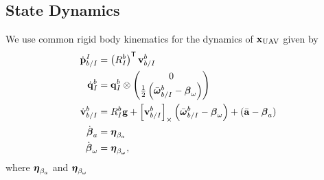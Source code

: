 
\subsection{State Dynamics}
We use common rigid body kinematics for the dynamics of
$\boldsymbol{\mathrm{x}}_{\text{UAV}}$ given by
\begin{align}
  \dot{\vect{p}}_{b/I}^I
  &=
  \left( R_I^b \right)^\transpose \vect{v}_{b/I}^b
  \label{eq:uav_dynamics}
  \\
  \dot{\vect{q}}_{I}^{b} 
	&= 	
  \q_I^b \otimes \begin{pmatrix} 0 \\ \frac{1}{2}
  \left( \bar{\vect{\omega}}_{b/I}^b - \vect{\beta}_\omega \right)
\end{pmatrix} \nonumber \\
  \dot{\vect{v}}_{b/I}^b 
  &=
  R_I^b \vect{g}
  +
  \skewmat{\vect{v}_{b/I}^b}
  \left( \bar{\vect{\omega}}_{b/I}^b - \vect{\beta}_\omega \right)
  +
  \left( \bar{\vect{a}} - \vect{\beta}_a \right) \nonumber
  \\
  \dot{\vect{\beta}}_a &= \vect{\eta}_{\beta_a} \nonumber
  \\
  \dot{\vect{\beta}}_\omega &= \vect{\eta}_{\beta_\omega}, \nonumber
\end{align}
where $\boldsymbol{\mathrm{\eta}}_{\beta_a}$ and $\boldsymbol{\mathrm{\eta}}_{\beta_\omega}$
